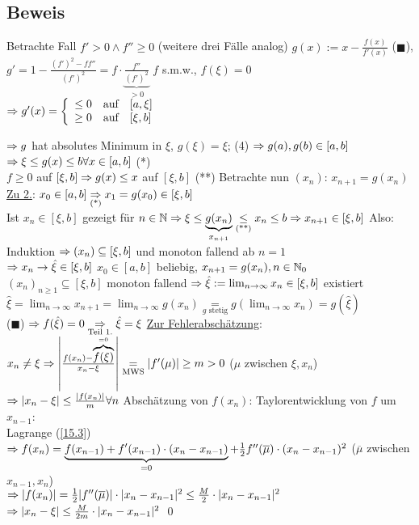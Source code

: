 \newpage

\subsection*{Beweis}
Betrachte Fall $f' > 0 \wedge f'' \ge 0$ (weitere drei Fälle analog)\nl
$g(x) := x - \frac{f(x)}{f'(x)}$ ($\blacksquare$), $g' = 1-\frac{(f')^2-f f''}{(f')^2} = f \cdot \underbrace{\frac{f''}{(f')^2}}_{>0}$\nl
$f$ s.m.w., $f(\xi)=0$\\
$\Rightarrow g'(x) = \left\{\begin{array}{l l l} \le 0 & \text{auf} & [a,\xi] \\ \ge 0 & \text{auf} & [\xi,b]\end{array}\right.$\nl
{}\nl
$\Rightarrow g$ hat absolutes Minimum in $\xi$, $g(\xi)=\xi$; (4) $\Rightarrow g(a), g(b) \in [a,b]$\\
$\Rightarrow \xi \le g(x) \le b \forall x \in [a,b]$ (*)\\
$f \ge 0$ auf $[\xi,b] \Rightarrow g(x) \le x$ auf $[\xi,b]$ (**)\nl
Betrachte nun $(x_n)$: $x_{n+1}=g(x_n)$\nl
\underline{Zu 2.}: $x_0 \in [a,b] \underset{\text{(*)}}{\Rightarrow} x_1 = g(x_0) \in [\xi,b]$\\
Ist $x_n \in [\xi,b]$ gezeigt für $n \in \mathbb{N} \Rightarrow \xi \le \underbrace{g(x_n)}_{x_{n+1}} \underset{\text{(**)}}{\le} x_n \le b \Rightarrow x_{n+1} \in [\xi,b]$\nl
Also: Induktion $\Rightarrow (x_n) \subseteq [\xi,b]$ und monoton fallend ab $n=1$\\
$\Rightarrow x_n \to \hat{\xi} \in [\xi,b]$\nl
$x_0 \in [a,b]$ beliebig, $x_{n+1}=g(x_n), n \in \mathbb{N}_0$\\
$(x_n)_{n \ge 1} \subseteq [\xi,b]$ monoton fallend $\Rightarrow \hat{\xi} := \lim_{n \to \infty} x_n \in [\xi,b]$ existiert\\
$\hat{\xi} = \lim_{n \to \infty} x_{n+1} = \lim_{n \to \infty} g(x_n) \underset{g \text{ stetig}}{=} g(\lim_{n \to \infty} x_n) = g(\hat{\xi})$\\
($\blacksquare$) $\Rightarrow f(\hat{\xi})=0 \underset{\text{Teil 1.}}{\Rightarrow} \hat{\xi}=\xi$\nl
\underline{Zur Fehlerabschätzung}: $x_n \neq \xi \Rightarrow \left|\frac{f(x_n)-\overbrace{f(\xi)}^{=0}}{x_n-\xi}\right| \underset{\text{MWS}}{=} |f'(\mu)| \ge m > 0$ ($\mu$ zwischen $\xi, x_n$)\\
$\Rightarrow |x_n-\xi| \le \frac{|f(x_n)|}{m} \forall n$\nl
Abschätzung von $f(x_n)$: Taylorentwicklung von $f$ um $x_{n-1}$:\\
Lagrange (\ref{15.3}) $\Rightarrow f(x_n) = \underbrace{f(x_{n-1})+f'(x_{n-1}) \cdot (x_n-x_{n-1})}_{=0} + \frac{1}{2} f''(\overline{\mu}) \cdot (x_n-x_{n-1})^2$ ($\overline{\mu}$ zwischen $x_{n-1}, x_n$)\\
$\Rightarrow |f(x_n)| = \frac{1}{2} |f''(\overline{\mu})| \cdot |x_n-x_{n-1}|^2 \le \frac{M}{2} \cdot |x_n-x_{n-1}|^2$\\
$\Rightarrow |x_n-\xi| \le \frac{M}{2m} \cdot |x_n-x_{n-1}|^2$ \qed

